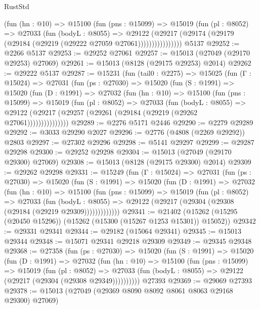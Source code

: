 \begin{lexlean}{RustStd}
\begin{coremodule}
                (fun (hn : @10) =>
                @15100
                  (fun (pns : @15099) =>
                  @15019
                    (fun (pl : @8052) =>
                    @27033
                      (fun (bodyL : @8055) =>
                      @29122
                        (@29217
                          (@29174 (@29179 (@29184 (@29219 (@29222 @27059 @27061))))))))))))))))
    @5137
@29252 := @2266 @5137
@29253 := @29252 @27061
@29257 := @15013 (@27049 (@29170 @29253) @27069)
@29261 := @15013 (@8128 (@29175 @29253) @2014)
@29262 := @29222 @5137
@29287 := @15231
    (fun (tail0 : @2275) =>
    @15025
      (fun (Γ : @15024) =>
      @27031
        (fun (ps : @27030) =>
        @15020
          (fun (S : @1991) =>
          @15020
            (fun (D : @1991) =>
            @27032
              (fun (hn : @10) =>
              @15100
                (fun (pns : @15099) =>
                @15019
                  (fun (pl : @8052) =>
                  @27033
                    (fun (bodyL : @8055) =>
                    @29122 (@29217 (@29257 (@29261 (@29184 (@29219 (@29262 @27061)))))))))))))))
@29289 := @2276 @5171 @2446
@29290 := @2279 @29289
@29292 := @3033 @29290 @2027
@29296 := @2776 (@4808 (@2269 @29292)) @2803
@29297 := @27302 @29296
@29298 := @5141 @29297
@29299 := @29287 @29298
@29300 := @29252 @29298
@29304 := @15013 (@27049 (@29170 @29300) @27069)
@29308 := @15013 (@8128 (@29175 @29300) @2014)
@29309 := @29262 @29298
@29331 := @15249
    (fun (Γ : @15024) =>
    @27031
      (fun (ps : @27030) =>
      @15020
        (fun (S : @1991) =>
        @15020
          (fun (D : @1991) =>
          @27032
            (fun (hn : @10) =>
            @15100
              (fun (pns : @15099) =>
              @15019
                (fun (pl : @8052) =>
                @27033
                  (fun (bodyL : @8055) =>
                  @29122 (@29217 (@29304 (@29308 (@29184 (@29219 @29309)))))))))))))
@29341 := @21402 (@15262 (@15295 (@20450 @15296)) (@15262 (@15300 (@15267 @1253 @15301)) @15052))
@29342 := @29331 @29341
@29344 := @29182 (@15064 @29341)
@29345 := @15013 @29344
@29348 := @15071 @29341 @29218 @29309
@29349 := @29345 @29348
@29368 := @27358
    (fun (ps : @27030) =>
    @15020
      (fun (S : @1991) =>
      @15020
        (fun (D : @1991) =>
        @27032
          (fun (hn : @10) =>
          @15100
            (fun (pns : @15099) =>
            @15019
              (fun (pl : @8052) =>
              @27033 (fun (bodyL : @8055) => @29122 (@29217 (@29304 (@29308 @29349))))))))))
    @27393
@29369 := @29069 @27393
@29378 := @15013 (@27049 (@29369 @8090 @8092 @8061 @8063 @29168 @29300) @27069)

\end{coremodule}
\end{lexlean}
